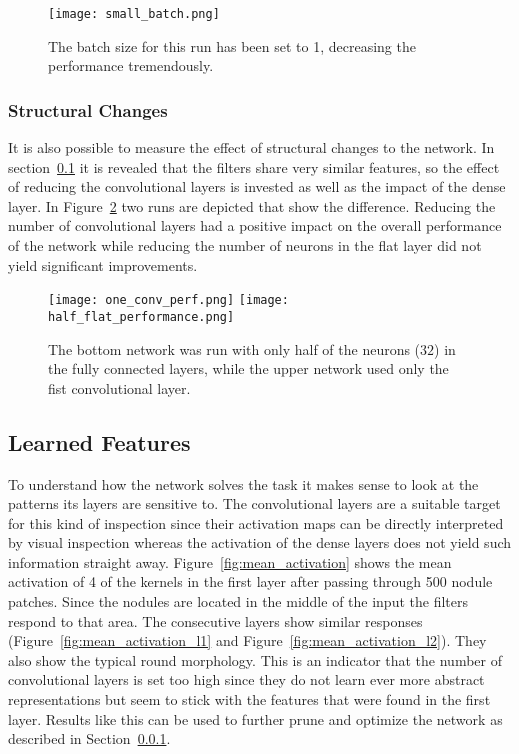 \documentclass[main.tex]{subfiles}
\begin{document}
\begin{figure}[H]
\begin{center}
\texttt{[image: small\_batch.png]}
\end{center}
\caption{The batch size for this run has been set to 1, decreasing the performance tremendously.}
\label{fig:small_batch}
\end{figure}

\subsubsection{Structural Changes}\label{sss:struct_changes}
 
It is also possible to measure the effect of structural changes to the network. In section~\ref{ss:features} it is revealed that the filters share very similar features, so the effect of reducing the convolutional layers is invested as well as the impact of the dense layer. In Figure~\ref{fig:structure_change} two runs are depicted that show the difference. Reducing the number of convolutional layers had a positive impact on the overall performance of the network while reducing the number of neurons in the flat layer did not yield significant improvements.


\begin{figure}[H]
\begin{center}
\texttt{[image: one\_conv\_perf.png]}
\texttt{[image: half\_flat\_performance.png]}
\end{center}
\caption{The bottom network was run with only half of the neurons ($32$) in the fully connected layers, while the upper network used only the fist convolutional layer.}
\label{fig:structure_change}
\end{figure}


\subsection{Learned Features}\label{ss:features}
To understand how the network solves the task it makes sense to look at the patterns its layers are sensitive to. The convolutional layers are a suitable target for this kind of inspection since their activation maps can be directly interpreted by visual inspection whereas the activation of the dense layers does not yield such information straight away. Figure~\ref{fig:mean_activation} shows the mean activation of 4 of the kernels in the first layer after passing through 500 nodule patches. Since the nodules are located in the middle of the input the filters respond to that area. The consecutive layers show similar responses (Figure~\ref{fig:mean_activation_l1} and Figure~\ref{fig:mean_activation_l2}). They also show the typical round morphology. This is an indicator that the number of convolutional layers is set too high since they do not learn ever more abstract representations but seem to stick with the features that were found in the first layer. Results like this can be used to further prune and optimize the network as described in Section~\ref{sss:struct_changes}.
\end{document}
